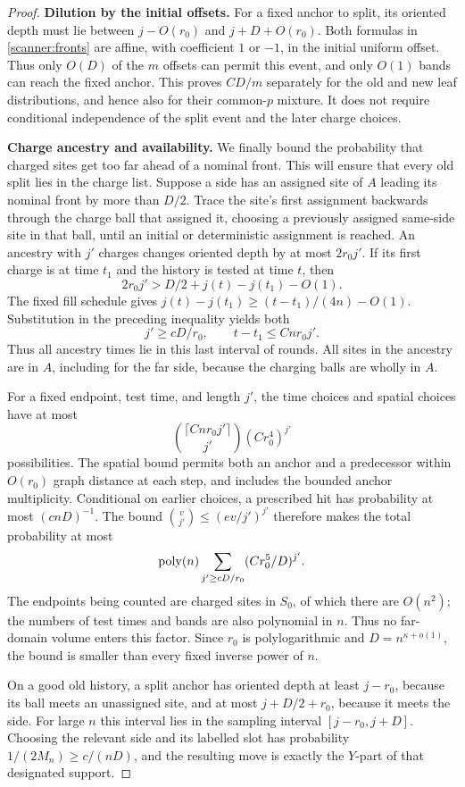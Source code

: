 \begin{proof}
\smallskip
\noindent\textbf{Dilution by the initial offsets.}
For a fixed anchor to split, its oriented depth must lie between
\(j-O(r_0)\) and \(j+D+O(r_0)\).  Both formulas in
\eqref{scanner:fronts} are affine, with coefficient \(1\) or \(-1\),
in the initial uniform offset.  Thus only \(O(D)\) of the \(m\)
offsets can permit this event, and only \(O(1)\) bands can reach the
fixed anchor.  This proves \(CD/m\) separately for the old and new
leaf distributions, and hence also for their common-\(p\) mixture.
It does not require conditional independence of the split event and
the later charge choices.

\smallskip
\noindent\textbf{Charge ancestry and availability.}
We finally bound the probability that charged sites get too far ahead of
a nominal front.  This will ensure that every old split lies in the
charge list.  Suppose a side has an assigned site of \(A\) leading
its nominal front by more than
\(D/2\).  Trace the site's first assignment backwards through the
charge ball that assigned it, choosing a previously assigned same-side
site in that ball, until an initial or deterministic assignment is
reached.  An ancestry with \(j'\) charges changes oriented depth by
at most \(2r_0j'\).  If its first charge is at time \(t_1\) and the
history is tested at time \(t\), then
\[
 2r_0j'>D/2+j(t)-j(t_1)-O(1).
\]
The fixed fill schedule gives
\(j(t)-j(t_1)\ge (t-t_1)/(4n)-O(1)\).  Substitution in the
preceding inequality yields both
\[
 j'\ge cD/r_0,\qquad t-t_1\le Cnr_0j'.
\]
Thus all ancestry times lie in this last interval of rounds.
All sites in the ancestry are in \(A\), including for the far side,
because the charging balls are wholly in \(A\).

For a fixed endpoint, test time, and length \(j'\), the time choices
and spatial choices have at most
\[
 \binom{\lceil Cnr_0j'\rceil}{j'}(Cr_0^4)^{j'}
\]
possibilities.  The spatial bound permits both an anchor and a
predecessor within \(O(r_0)\) graph distance at each step, and includes
the bounded anchor multiplicity.  Conditional on earlier choices, a
prescribed hit has probability at most \((cnD)^{-1}\).  The bound
\(\binom{v}{j'}\le(ev/j')^{j'}\) therefore makes the total probability
at most
\[
 \operatorname{poly}(n)\sum_{j'\ge cD/r_0}(Cr_0^5/D)^{j'}.
\]
The endpoints being counted are charged sites in \(S_0\), of which
there are \(O(n^2)\); the numbers of test times and bands are also
polynomial in \(n\).  Thus no far-domain volume enters this factor.
Since \(r_0\) is polylogarithmic and \(D=n^{\kappa+o(1)}\), the bound
is smaller than
every fixed inverse power of \(n\).

On a good old history, a split anchor has oriented depth at least
\(j-r_0\), because its ball meets an unassigned site, and at most
\(j+D/2+r_0\), because it meets the side.  For large \(n\) this
interval lies in the sampling interval \([j-r_0,j+D]\).  Choosing
the relevant side and its labelled slot has probability
\(1/(2M_n)\ge c/(nD)\), and the resulting move is exactly the
\(Y\)-part of that designated support.
\end{proof}

